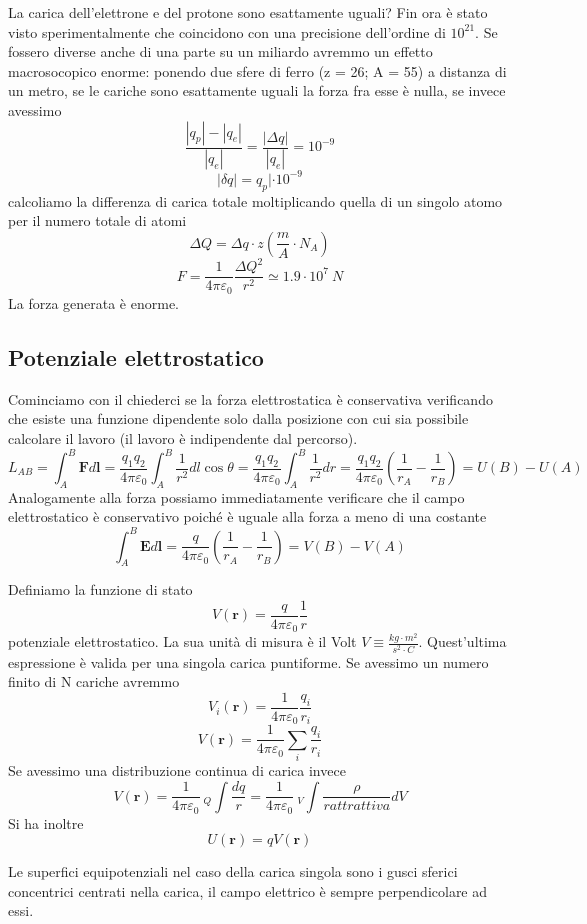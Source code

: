 \documentclass[
10pt, %
a4paper, %
oneside, %
headinclude,footinclude, %
BCOR5mm, %
]{scrartcl}
\begin{document}
La carica dell'elettrone e del protone sono esattamente uguali? Fin ora è stato visto sperimentalmente che coincidono con una precisione dell'ordine di \(10^{21}\). Se fossero diverse anche di una parte su un miliardo avremmo un effetto macrosocopico enorme: ponendo due sfere di ferro (z = 26; A = 55) a distanza di un metro, se le cariche sono esattamente uguali la forza fra esse è nulla, se invece avessimo 
\[\frac{|q_p|-|q_e|}{|q_e|} = \frac{|\Delta q|}{|q_e|}=10^{-9}\]
\[|\delta q| = q_p|\cdot10^{-9}\]
calcoliamo la differenza di carica totale moltiplicando quella di un singolo atomo per il numero totale di atomi
\[\Delta Q = \Delta q\cdot z \left(\frac{m}{A}\cdot N_A\right) \]
\[F=\frac{1}{4\pi\varepsilon_0}\frac{\Delta Q^2}{r^2}\simeq 1.9\cdot10^{7}\ N\]
La forza generata è enorme. 
\subsection{Potenziale elettrostatico}
Cominciamo con il chiederci se la forza elettrostatica è conservativa verificando che esiste una funzione dipendente solo dalla posizione con cui sia possibile calcolare il lavoro (il lavoro è indipendente dal percorso). 
\[L_{AB} = \int_{A}^{B}\mathbf{F}d\mathbf{l}= \frac{q_1q_2}{4\pi\varepsilon_0}\int_{A}^{B}\frac{1}{r^2}dl\cos\theta=\frac{q_1q_2}{4\pi\varepsilon_0}\int_{A}^{B}\frac{1}{r^2}dr=\frac{q_1q_2}{4\pi\varepsilon_0}\left(\frac{1}{r_A}-\frac{1}{r_B}\right)=U(B)-U(A)\]
Analogamente alla forza possiamo immediatamente verificare che il campo elettrostatico è conservativo poiché è uguale alla forza a meno di una costante
\[\int_{A}^{B}\mathbf{E}d\mathbf{l}=\frac{q}{4\pi\varepsilon_0}\left(\frac{1}{r_A}-\frac{1}{r_B}\right)=V(B)-V(A)\]
\begin{definizione}
Definiamo la funzione di stato 
\[V(\mathbf{r}) = \frac{q}{4\pi\varepsilon_0}\frac{1}{r}\]
potenziale elettrostatico. La sua unità di misura è il Volt $V \equiv \frac{kg\cdot m^2}{s^2\cdot C}$.  Quest'ultima espressione è valida per una singola carica puntiforme. Se avessimo un numero finito di N cariche avremmo
\[V_i(\mathbf{r}) = \frac{1}{4\pi\varepsilon_0}\frac{q_i}{r_i}\]
\[V(\mathbf{r})= \frac{1}{4\pi\varepsilon_0}\sum_{i}\frac{q_i}{r_i}\]
Se avessimo una distribuzione continua di carica invece
\[V(\mathbf{r})= \frac{1}{4\pi\varepsilon_0}\ _Q\int\frac{d q}{r} =  \frac{1}{4\pi\varepsilon_0}\ _V\int\frac{\rho}{ rattrattiva}dV\]
Si ha inoltre 
\[U(\mathbf{r})=qV(\mathbf{r})\]
\end{definizione}
Le superfici equipotenziali nel caso della carica singola sono i gusci sferici concentrici centrati nella carica, il campo elettrico è sempre perpendicolare ad essi.\\
\end{document}
